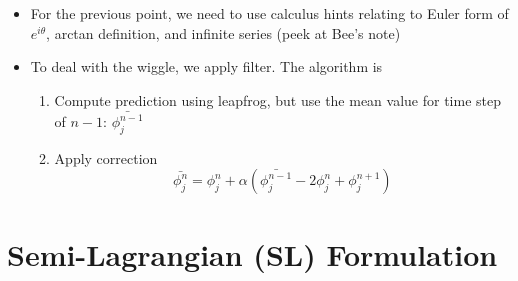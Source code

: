 \documentclass{article}
\begin{document}
\begin{itemize}
    \item For the previous point, we need to use calculus hints relating to Euler form of $e^{i\theta}$, arctan definition, and infinite series (peek at Bee's note)
    \item To deal with the wiggle, we apply filter. The algorithm is
    \begin{enumerate}
        \item Compute prediction using leapfrog, but use the mean value for time step of $n-1$: $\bar{\phi_j^{n-1}}$
        \item Apply correction
        \[ \bar{\phi_j^n} = \phi_j^n + \alpha (\bar{\phi_j^{n-1}} -2\phi_j^n + \phi_j^{n+1}) \]
    \end{enumerate}
\end{itemize}

\section{Semi-Lagrangian (SL) Formulation}
\end{document}
